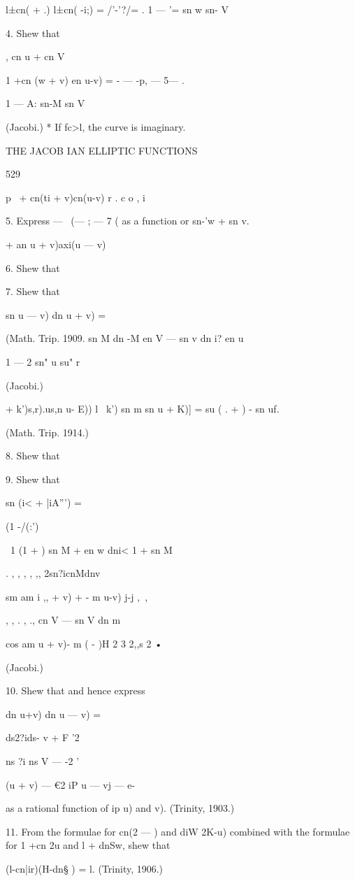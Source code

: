  l±cn( + .) l±cn( -i;) = /'-'?/= . 1 — '= sn w sn- V

4. Shew that

, cn u + cn V

1 +cn (w + v) en u-v) = - — -p, — 5— .

  1 — A: sn-M sn V

(Jacobi.) * If fc>l, the curve is imaginary.

THE JACOB IAN ELLIPTIC FUNCTIONS

529

p \ + cn(ti + v)cn(u-v) r . c o , i

5. Express — \ (— ; — 7 ( as a function or sn-'w + sn v.

   + an u + v)axi(u — v)

6. Shew that

7. Shew that

sn u — v) dn u + v) =

(Math. Trip. 1909. sn M dn -M en V — sn v dn i? en u

1 — 2 sn" u su" r

(Jacobi.)

    + k')s,r).us,n u- E)) l~ k') sn m sn u + K)] = su ( . + ) - sn uf.

(Math. Trip. 1914.)

8. Shew that

9. Shew that

sn (i< + |iA''') =

(1 -/(:')

\ 1 (1 + ) sn M + en w dni< 1 + sn M

. , , , , ,, 2sn?icnMdnv

sm am i ,, + v) + - m u-v) j-j ,~,

, , . , ., cn V — sn V dn m

cos am u + v)- m ( - )H 2 3 2,,s 2 •

(Jacobi.)

10. Shew that and hence express

dn u+v) dn u — v) =

ds2?ids- v + F '2

ns ?i ns V — -2 '

(u + v) — €2 iP u — vj — e-

as a rational function of ip u) and v). (Trinity, 1903.)

11. From the formulae for cn(2 — ) and diW 2K-u) combined with the
formulae for 1 +cn 2u and l + dnSw, shew that

(l-cn|ir)(H-dn§ ) = l. (Trinity, 1906.)

